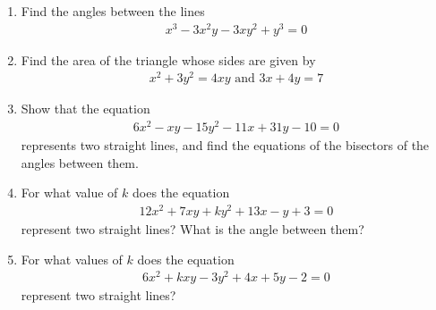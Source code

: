\begin{enumerate}[1.]
\item Find the angles between the lines
\begin{align*}
x^3-3x^2y-3xy^2+y^3 = 0
\end{align*}
\item Find the area of the triangle whose sides are given by
\begin{align*}
x^2+3y^2 = 4xy \text{ and } 3x+4y=7
\end{align*}
\item Show that the equation
\begin{align*}
6x^2-xy-15y^2-11x+31y-10=0
\end{align*}
represents two straight lines, and find the equations of the bisectors of the angles between them.
\item For what value of $k$ does the equation
\begin{align*}
12x^2+7xy+ky^2+13x-y+3 = 0
\end{align*}
represent two straight lines? What is the angle between them?
\item For what values of $k$ does the equation
\begin{align*}
6x^2+kxy-3y^2+4x+5y-2 = 0
\end{align*}
represent two straight lines?
\end{enumerate}